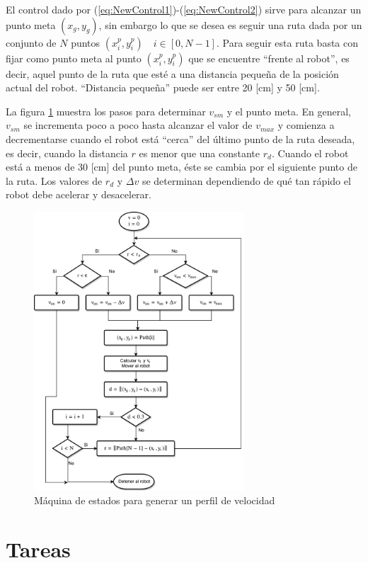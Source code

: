 \documentclass[letterpaper,12pt]{article}
\begin{document}
El control dado por (\ref{eq:NewControl1})-(\ref{eq:NewControl2}) sirve para alcanzar un punto meta $(x_g, y_g)$, sin embargo lo que se desea es seguir una ruta dada por un conjunto de $N$ puntos $(x^p_i, y^p_i)\quad i\in[0, N-1]$. Para seguir esta ruta basta con fijar como punto meta al punto $(x^p_i, y^p_i)$ que se encuentre ``frente al robot'', es decir, aquel punto de la ruta que esté a una distancia pequeña de la posición actual del robot. ``Distancia pequeña'' puede ser entre 20 [cm] y 50 [cm]. 

La figura \ref{fig:AFSM} muestra los pasos para determinar $v_{sm}$ y el punto meta. En general, $v_{sm}$ se incrementa poco a poco hasta alcanzar el valor de $v_{max}$ y comienza a decrementarse cuando el robot está ``cerca'' del último punto de la ruta deseada, es decir, cuando la distancia $r$ es menor que una constante $r_d$. Cuando el robot está a menos de 30 [cm] del punto meta, éste se cambia por el siguiente punto de la ruta. Los valores de $r_d$ y $\Delta v$ se determinan dependiendo de qué tan rápido el robot debe acelerar y desacelerar. 

\begin{figure}[!h]
  \centering
  \includegraphics[width=0.7\textwidth]{Figures/AFSM.pdf}
  \caption{Máquina de estados para generar un perfil de velocidad}
  \label{fig:AFSM}
\end{figure}

\section{Tareas}
\end{document}
